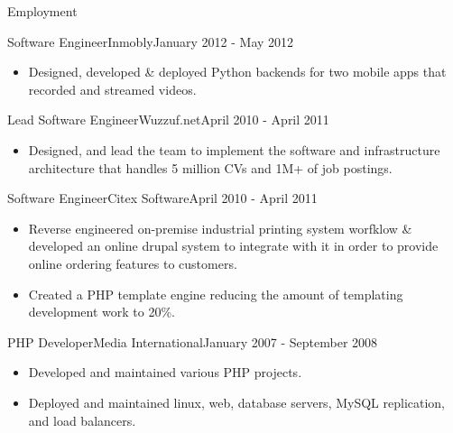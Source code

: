 \documentclass[]{mosabcv}
\begin{document}
\begin{cvsection}{Employment}
        \begin{cvsubsection}{Software Engineer}{Inmobly}{January 2012 - May 2012}
            \begin{itemize}
                \item Designed, developed \& deployed Python backends for two mobile apps that recorded and streamed videos.
            \end{itemize}
        \end{cvsubsection}

        \begin{cvsubsection}{Lead Software Engineer}{Wuzzuf.net}{April 2010 - April 2011}
            \begin{itemize}
                \item Designed, and lead the team to implement the software and infrastructure architecture that handles 5 million CVs and 1M+ of job postings.
            \end{itemize}
        \end{cvsubsection}

        \begin{cvsubsection}{Software Engineer}{Citex Software}{April 2010 - April 2011}
            \begin{itemize}
                \item Reverse engineered on-premise industrial printing system worfklow \& developed an online drupal system to integrate with it in order to provide online ordering features to customers.
                \item Created a PHP template engine reducing the amount of templating development work to 20\%.
            \end{itemize}
        \end{cvsubsection}

        \begin{cvsubsection}{PHP Developer}{Media International}{January 2007 - September 2008}
            \begin{itemize}
                \item Developed and maintained various PHP projects.
                \item Deployed and maintained linux, web, database servers, MySQL replication, and load balancers.
            \end{itemize}
        \end{cvsubsection}


\end{cvsection}
\end{document}
